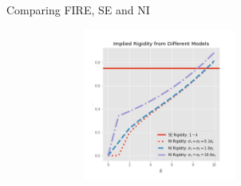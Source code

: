 \documentclass{beamer}
\begin{document}





\begin{frame}{Comparing FIRE, SE and NI}


\begin{figure}
	\includegraphics[height=5cm,width=8cm]{figuresDraft/rigidity} 
\end{figure}

\end{frame}
\end{document}
